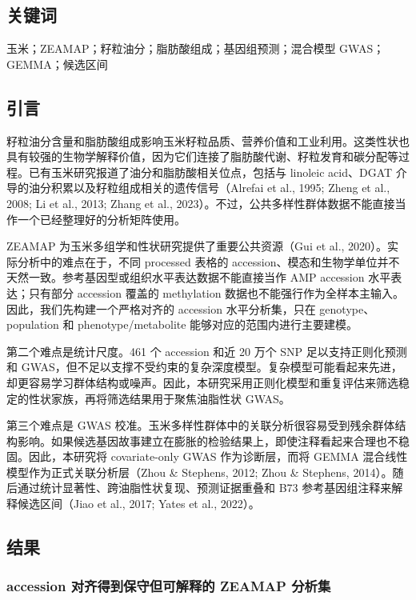 \documentclass[
]{article}
\begin{document}
\subsection{关键词}\label{ux5173ux952eux8bcd}

玉米；ZEAMAP；籽粒油分；脂肪酸组成；基因组预测；混合模型
GWAS；GEMMA；候选区间

\subsection{引言}\label{ux5f15ux8a00}

籽粒油分含量和脂肪酸组成影响玉米籽粒品质、营养价值和工业利用。这类性状也具有较强的生物学解释价值，因为它们连接了脂肪酸代谢、籽粒发育和碳分配等过程。已有玉米研究报道了油分和脂肪酸相关位点，包括与
linoleic acid、DGAT 介导的油分积累以及籽粒组成相关的遗传信号（Alrefai et
al., 1995; Zheng et al., 2008; Li et al., 2013; Zhang et al.,
2023）。不过，公共多样性群体数据不能直接当作一个已经整理好的分析矩阵使用。

ZEAMAP 为玉米多组学和性状研究提供了重要公共资源（Gui et al.,
2020）。实际分析中的难点在于，不同 processed 表格的
accession、模态和生物学单位并不天然一致。参考基因型或组织水平表达数据不能直接当作
AMP accession 水平表达；只有部分 accession 覆盖的 methylation
数据也不能强行作为全样本主输入。因此，我们先构建一个严格对齐的 accession
水平分析集，只在 genotype、population 和 phenotype/metabolite
能够对应的范围内进行主要建模。

第二个难点是统计尺度。461 个 accession 和近 20 万个 SNP
足以支持正则化预测和
GWAS，但不足以支撑不受约束的复杂深度模型。复杂模型可能看起来先进，却更容易学习群体结构或噪声。因此，本研究采用正则化模型和重复评估来筛选稳定的性状家族，再将筛选结果用于聚焦油脂性状
GWAS。

第三个难点是 GWAS
校准。玉米多样性群体中的关联分析很容易受到残余群体结构影响。如果候选基因故事建立在膨胀的检验结果上，即使注释看起来合理也不稳固。因此，本研究将
covariate-only GWAS 作为诊断层，而将 GEMMA
混合线性模型作为正式关联分析层（Zhou \& Stephens, 2012; Zhou \&
Stephens, 2014）。随后通过统计显著性、跨油脂性状复现、预测证据重叠和 B73
参考基因组注释来解释候选区间（Jiao et al., 2017; Yates et al., 2022）。

\subsection{结果}\label{ux7ed3ux679c}

\subsubsection{accession 对齐得到保守但可解释的 ZEAMAP
分析集}\label{accession-ux5bf9ux9f50ux5f97ux5230ux4fddux5b88ux4f46ux53efux89e3ux91caux7684-zeamap-ux5206ux6790ux96c6}
\end{document}

